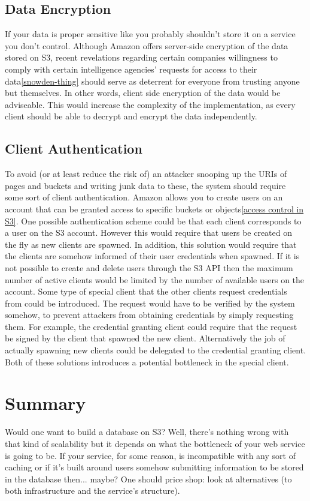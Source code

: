 \documentclass[11pt]{article}
\begin{document}
\subsection{Data Encryption}
If your data is proper sensitive like you probably shouldn't store it on a service you don't control.
Although Amazon offers server-side encryption of the data stored on S3, recent revelations regarding certain companies willingness to comply with certain intelligence agencies' requests for access to their data\ref{snowden-thing} should serve as deterrent for everyone from trusting anyone but themselves.
In other words, client side encryption of the data would be adviseable.
This would increase the complexity of the implementation, as every client should be able to decrypt and encrypt the data independently.

\subsection{Client Authentication}
To avoid (or at least reduce the risk of) an attacker snooping up the URIs of pages and buckets and writing junk data to these, the system should require some sort of client authentication.
Amazon allows you to create users on an account that can be granted access to specific buckets or objects\ref{access control in S3}.
One possible authentication scheme could be that each client corresponds to a user on the S3 account.
However this would require that users be created on the fly as new clients are spawned.
In addition, this solution would require that the clients are somehow informed of their user credentials when spawned.
If it is not possible to create and delete users through the S3 API then the maximum number of active clients would be limited by the number of available users on the account.
Some type of special client that the other clients request credentials from could be introduced.
The request would have to be verified by the system somehow, to prevent attackers from obtaining credentials by simply requesting them.
For example, the credential granting client could require that the request be signed by the client that spawned the new client.
Alternatively the job of actually spawning new clients could be delegated to the credential granting client.
Both of these solutions introduces a potential bottleneck in the special client.

\section{Summary}
Would one want to build a database on S3?
Well, there's nothing wrong with that kind of scalability but it depends on what the bottleneck of your web service is going to be.
If your service, for some reason, is incompatible with any sort of caching or if it's built around users somehow submitting information to be stored in the database then... maybe?
One should price shop: look at alternatives (to both infrastructure and the service's structure).
\end{document}
